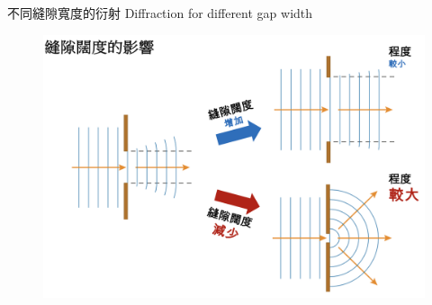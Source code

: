 \documentclass[beamer=true]{standalone}
\begin{document}
\begin{frame}{不同縫隙寬度的衍射 Diffraction for different gap width}
    \begin{figure}
        \centering
        \includegraphics[width=0.95\linewidth]{images/Screenshot 2023-09-27 at 9.51.08 PM.png}


    \end{figure}
\end{frame}
\end{document}

